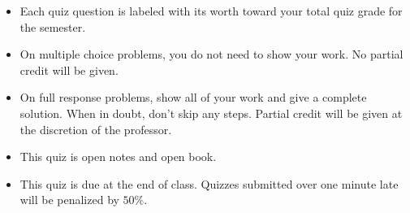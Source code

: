 \documentclass[12pt]{exam}
\newcommand{\<}{(}
\renewcommand{\>}{)}
\begin{document}
\begin{center}
\end{center}
\vspace{0.1in}

\vspace{12pt}

\begin{itemize}
  \item Each quiz question is labeled with its worth toward your total quiz
        grade for the semester.
  \item On multiple choice problems, you do not need to show your work. No
        partial credit will be given.
  \item On full response problems, show all of your work and give a
        complete solution. When in doubt, don't skip any steps. Partial
        credit will be given at the discretion of the professor.
  \item This quiz is open notes and open book.
  \item This quiz is due at the end of class. Quizzes submitted over one minute
        late will be penalized by \(50\%\).
\end{itemize}

\newpage
\end{document}
